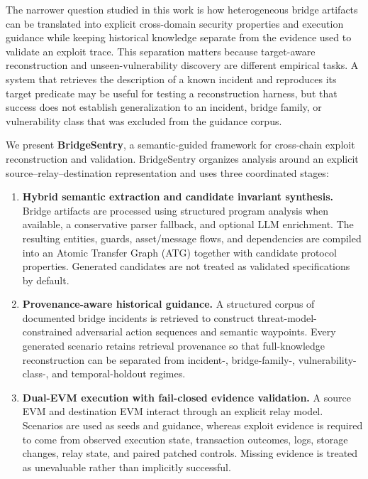The narrower question studied in this work is how heterogeneous bridge artifacts can be translated into explicit cross-domain security properties and execution guidance while keeping historical knowledge separate from the evidence used to validate an exploit trace. This separation matters because target-aware reconstruction and unseen-vulnerability discovery are different empirical tasks. A system that retrieves the description of a known incident and reproduces its target predicate may be useful for testing a reconstruction harness, but that success does not establish generalization to an incident, bridge family, or vulnerability class that was excluded from the guidance corpus.

We present \textbf{BridgeSentry}, a semantic-guided framework for cross-chain exploit reconstruction and validation. BridgeSentry organizes analysis around an explicit source--relay--destination representation and uses three coordinated stages:

\begin{enumerate}
    \item \textbf{Hybrid semantic extraction and candidate invariant synthesis.} Bridge artifacts are processed using structured program analysis when available, a conservative parser fallback, and optional LLM enrichment. The resulting entities, guards, asset/message flows, and dependencies are compiled into an Atomic Transfer Graph (ATG) together with candidate protocol properties. Generated candidates are not treated as validated specifications by default.

    \item \textbf{Provenance-aware historical guidance.} A structured corpus of documented bridge incidents is retrieved to construct threat-model-constrained adversarial action sequences and semantic waypoints. Every generated scenario retains retrieval provenance so that full-knowledge reconstruction can be separated from incident-, bridge-family-, vulnerability-class-, and temporal-holdout regimes.

    \item \textbf{Dual-EVM execution with fail-closed evidence validation.} A source EVM and destination EVM interact through an explicit relay model. Scenarios are used as seeds and guidance, whereas exploit evidence is required to come from observed execution state, transaction outcomes, logs, storage changes, relay state, and paired patched controls. Missing evidence is treated as unevaluable rather than implicitly successful.
\end{enumerate}

